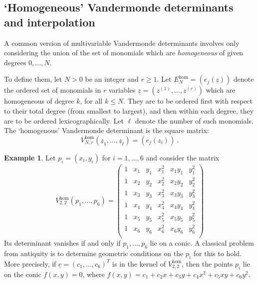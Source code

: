 \documentclass[10pt]{amsart}
\theoremstyle{definition}
\newtheorem{example}[thm]{Example}
\theoremstyle{remark}
\numberwithin{equation}{section}
\newcommand{\z}{\underline{z}}
\newcommand{\0}{\color{blue}{\mathsf{0}}}
\begin{document}
\subsection{`Homogeneous' Vandermonde determinants and interpolation} \label{sect: Homogeneous}
A common version of multivariable Vandermonde determinants involves only considering the union of the set of  monomials which are \emph{homogeneous}  of given degrees $0,\ldots,N$.

To define them, let $N>0$  be an integer and $r\geq 1$. Let 
$E^{\mathrm{hom}}_N=(e_j(\z))$ denote the ordered set of monomials in
 $r$ variables $\z= (z^{(1)}, \ldots, z^{(r)})$  which are homogeneous of  degree  $k$, for all $k\leq N$. They are to be ordered first with respect to their total degree (from smallest to largest), and then within each   degree, they are to be ordered lexicographically. Let $\ell$ denote the number of such monomials. The `homogenous' Vandermonde determinant is the square matrix:
\begin{equation} \label{HomVandermonde}
V_{N,r}^{\mathrm{hom}} (\z_1,\ldots, \z_\ell) = ( e_j(z_i)) \ .
\end{equation} 


\begin{example} \label{example: Pascal}
Let $p_i=(x_i,y_i)$ for $i=1,\ldots, 6$ and consider the   matrix
\begin{equation} \label{Vhomconic} V^{\mathrm{hom}}_{2,2}(p_1,\ldots, p_6) =  \begin{pmatrix} 1 & x_1 & y_1 & x_1^2 & x_1y_1 & y_1^2  \\ 
1 & x_2 & y_2 & x_2^2 & x_2y_2 & y_2^2  \\
1 & x_3 & y_3 & x_3^2 & x_3y_3 & y_3^2  \\
1 & x_4 & y_4 & x_4^2 & x_4y_4 & y_4^2  \\
1 & x_5 & y_5 & x_5^2 & x_5y_5 & y_5^2  \\
1 & x_6 & y_6 & x_6^2 & x_6y_6 & y_6^2  \\
\end{pmatrix}
\end{equation}
Its determinant vanishes if and only if $p_1,\ldots, p_6$ lie on a conic. A classical problem from antiquity is to determine  geometric conditions on the $p_i$ for this to hold.
 More precisely, if $\underline{c}=(c_1,\ldots, c_6)^T$   is in the kernel of  $V^{\mathrm{hom}}_{2,2}$, then the points $p_i$ lie on the conic $f(x,y)=0$, where $f(x,y)=c_1 + c_2 x + c_3 y +c_4 x^2 + c_5 xy + c_6 y^2$.
\end{example}
\end{document}
